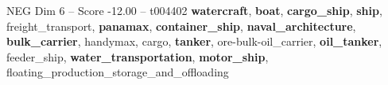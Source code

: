 \begin{textsample}{NEG Dim 6 – Score -12.00 – t004402}  \label{ex:f6_neg_009}
\textbf{watercraft}, \textbf{boat}, \textbf{cargo\_ship}, \textbf{ship}, freight\_transport, \textbf{panamax}, \textbf{container\_ship}, \textbf{naval\_architecture}, \textbf{bulk\_carrier}, handymax, cargo, \textbf{tanker}, ore-bulk-oil\_carrier, \textbf{oil\_tanker}, feeder\_ship, \textbf{water\_transportation}, \textbf{motor\_ship}, floating\_production\_storage\_and\_offloading

\end{textsample}
